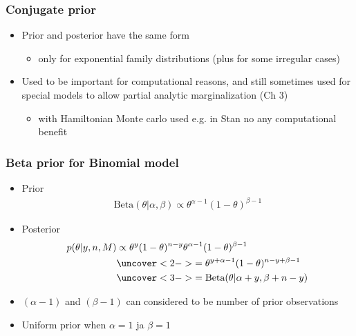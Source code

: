\documentclass[english,t]{beamer}
\begin{document}
\begin{frame}

  \frametitle{Conjugate prior}

  \begin{itemize}
  \item Prior and posterior have the same form
    \begin{itemize}
    \item only for exponential family distributions (plus for
      some irregular cases)
    \end{itemize}
  \item Used to be important for computational reasons, and still
    sometimes used for special models to allow partial analytic
    marginalization (Ch 3)
    \begin{itemize}
    \item with Hamiltonian Monte carlo used e.g. in Stan no any
      computational benefit
    \end{itemize}
  \end{itemize}
  
\end{frame}

\begin{frame}

  \frametitle{Beta prior for Binomial model}

  \begin{itemize}
  \item Prior \baselineskip
    \begin{align*}
      \text{Beta}(\theta|\alpha,\beta) \propto \theta^{\alpha-1}
      (1-\theta)^{\beta-1}
    \end{align*}
  \item Posterior
    \baselineskip
    \begin{align*}
      p(\theta|y,n,M) & \propto \theta^y(1-\theta)^{n-y}
      \theta^{\alpha-1} (1-\theta)^{\beta-1}\\
      &\uncover<2->{ =
      \theta^{y+\alpha-1} (1-\theta)^{n-y+\beta-1}}\\
      &\uncover<3->{ = \text{Beta}(\theta|\alpha+y,\beta+n-y)}
    \end{align*}
    \vskip -2mm
  \item<4-> $(\alpha-1)$ and $(\beta-1)$ can considered to be number of prior observations
  \item<4-> Uniform prior when $\alpha=1$ ja $\beta=1$ 
  \end{itemize}
\end{frame}
\end{document}
